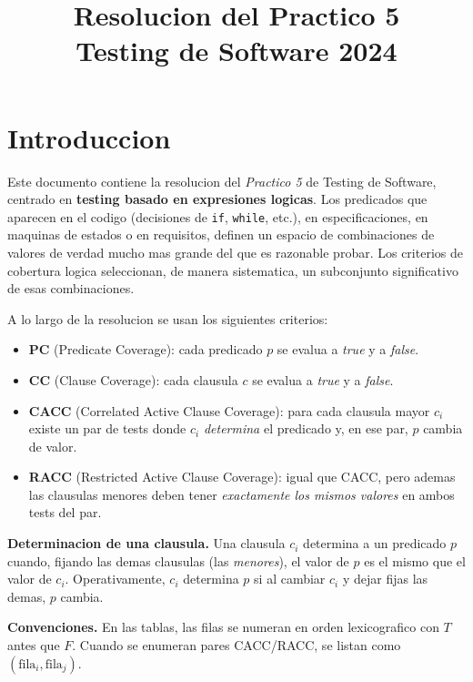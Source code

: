 \documentclass[12pt,a4paper]{article}
\title{\textbf{Resolucion del Practico 5}\\Testing de Software 2024}
\author{}
\date{}
\begin{document}
\maketitle
\tableofcontents
\newpage

\section*{Introduccion}

Este documento contiene la resolucion del \textit{Practico 5} de Testing de Software, centrado
en \textbf{testing basado en expresiones logicas}. Los predicados que aparecen en el codigo
(decisiones de \texttt{if}, \texttt{while}, etc.), en especificaciones, en maquinas de estados o
en requisitos, definen un espacio de combinaciones de valores de verdad mucho mas grande del que
es razonable probar. Los criterios de cobertura logica seleccionan, de manera sistematica, un
subconjunto significativo de esas combinaciones.

A lo largo de la resolucion se usan los siguientes criterios:

\begin{itemize}
  \item \textbf{PC} (Predicate Coverage): cada predicado $p$ se evalua a \textit{true} y a
  \textit{false}.
  \item \textbf{CC} (Clause Coverage): cada clausula $c$ se evalua a \textit{true} y a
  \textit{false}.
  \item \textbf{CACC} (Correlated Active Clause Coverage): para cada clausula mayor $c_i$ existe
  un par de tests donde $c_i$ \emph{determina} el predicado y, en ese par, $p$ cambia de valor.
  \item \textbf{RACC} (Restricted Active Clause Coverage): igual que CACC, pero ademas las
  clausulas menores deben tener \emph{exactamente los mismos valores} en ambos tests del par.
\end{itemize}

\textbf{Determinacion de una clausula.} Una clausula $c_i$ determina a un predicado $p$ cuando,
fijando las demas clausulas (las \emph{menores}), el valor de $p$ es el mismo que el valor de
$c_i$. Operativamente, $c_i$ determina $p$ si al cambiar $c_i$ y dejar fijas las demas, $p$
cambia.

\textbf{Convenciones.} En las tablas, las filas se numeran en orden lexicografico con $T$ antes
que $F$. Cuando se enumeran pares CACC/RACC, se listan como $(\text{fila}_i, \text{fila}_j)$.
\end{document}
